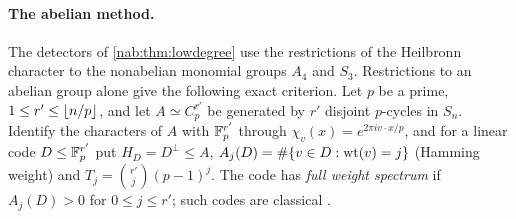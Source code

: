 \paragraph{The abelian method.}
The detectors of \cref{nab:thm:lowdegree} use the restrictions of the Heilbronn character to
the nonabelian monomial groups $A_4$ and $S_3$. Restrictions to an abelian group alone give
the following exact criterion. Let $p$ be a prime, $1\le r'\le\lfloor n/p\rfloor$, and let
$A\simeq C_p^{r'}$ be generated by $r'$ disjoint $p$-cycles in $S_n$. Identify the characters of
$A$ with $\mathbb{F}_p^{r'}$ through $\chi_v(x)=e^{2\pi iv\cdot x/p}$, and for a linear code
$D\le\mathbb{F}_p^{r'}$ put $H_D=D^\perp\le A$, $A_j(D)=\#\{v\in D:\operatorname{wt}(v)=j\}$ (Hamming
weight) and $T_j=\binom{r'}j(p-1)^j$. The code has \emph{full weight spectrum} if
$A_j(D)>0$ for $0\le j\le r'$; such codes are classical \cite{Alderson2019Full}.

